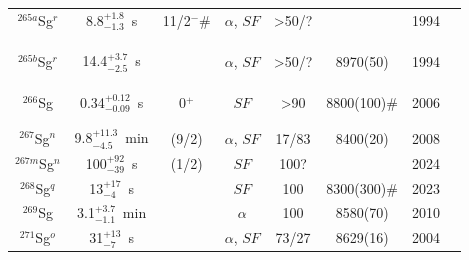 \begin{center}
\begin{longtable}{c|ccccccl}
$^{265a}$Sg$^r$&8.8$^{+1.8}_{-1.3}$~s&11/2$^-$\#&$\alpha$, $SF$&>50/?	&	                &1994	&{\tiny\cite{Lazarev1994a,Lougheed1994,Lazarev1996,Schaedel1997,Schaedel1997a,Tuerler1998}}\\
			&				&			&					&			& 				    &		&{\tiny\cite{Holden2000,Duellmann2002,Hofmann2002,Tuerler2003,Zweidorf2004,Dvorak2006}}\\
			&				&			&					&			& 				    &		&{\tiny\cite{Nishio2006,Morita2007,Duellmann2008,Dvorak2009,Graeger2010,Haba2012}}\\
			&				&			&					&			& 				    &		&{\tiny\cite{Tuerler2012,Sumita2013,Oganessian2024}}\\
$^{265b}$Sg$^r$&14.4$^{+3.7}_{-2.5}$~s& &$\alpha$, $SF$	    &>50/?		&8970(50)	        &1994	&{\tiny\cite{Lazarev1994a,Lougheed1994,Lazarev1996,Schaedel1997,Schaedel1997a,Tuerler1998}}\\
			&				&			&					&			& 				    &		&{\tiny\cite{Holden2000,Duellmann2002,Hofmann2002,Tuerler2003,Zweidorf2004,Dvorak2006}}\\
			&				&			&					&			& 				    &		&{\tiny\cite{Nishio2006,Morita2007,Duellmann2008,Dvorak2009,Graeger2010,Haba2012}}\\
			&				&			&					&			& 				    &		&{\tiny\cite{Tuerler2012,Sumita2013,Oganessian2024}}\\
$^{266}$Sg	& 0.34$^{+0.12}_{-0.09}$~s& 0$^+$&$SF$			&>90 		&8800(100)$\#$	    &2006	&{\tiny\cite{Lazarev1994a,Lougheed1994,Schaedel1997,Schaedel1997a,Tuerler1998,Huebener2001}}\\
			&				&			&					&			& 				    &		&{\tiny\cite{Duellmann2002,Tuerler2003,Zweidorf2004,Dvorak2006,Dvorak2008,Oganessian2011a}}\\
			&				&			&					&			& 				    &		&{\tiny\cite{Tuerler2012,Oganessian2013a,Hinde2018}}\\
$^{267}$Sg$^n$	&9.8$^{+11.3}_{-4.5}$~min&(9/2)&$\alpha$, $SF$&17/83    &8400(20)		    &2008	&{\tiny\cite{Dvorak2008,Graeger2010,Tuerler2012,Oganessian2024}}\\
$^{267m}$Sg$^n$&100$^{+92}_{-39}$~s&(1/2)&$SF$				&100?		&        	        &2024	&{\tiny\cite{Oganessian2024}}\\
$^{268}$Sg$^q$& 13$^{+17}_{-4}$~s&		&$SF$				&100		&8300(300)$\#$	    &2023	&{\tiny\cite{Oganessian2023}}\\
$^{269}$Sg	& 3.1$^{+3.7}_{-1.1}$~min& 	&$\alpha$			&100		&8580(70)		    &2010	&{\tiny\cite{Ellison2010,Nishio2010,Utyonkov2015,Utyonkov2018}}\\
$^{271}$Sg$^o$& 31$^{+13}_{-7}$~s& 		&$\alpha$, $SF$		&73/27		&8629(16)		    &2004	&{\tiny\cite{Oganessian2004a,Oganessian2011a,Oganessian2022b}}\\

\end{longtable}
\end{center}
